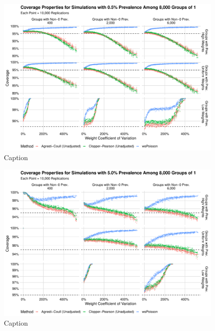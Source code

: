 \documentclass[AMA,STIX1COL]{WileyNJD-v2}
\begin{document}
\begin{figure}
    \centering
    \includegraphics[width=\textwidth]{figures/perfect_coverage_8000_0_005_reduced.pdf}
    \caption{Caption}
    \label{fig:perfect_coverage_8000_0_005_reduced}
\end{figure}

\begin{figure}
    \centering
    \includegraphics[width=\textwidth]{figures/perfect_coverage_8000_0_05_reduced.pdf}
    \caption{Caption}
    \label{fig:perfect_coverage_8000_0_05_reduced.pdf}
\end{figure}
\end{document}
